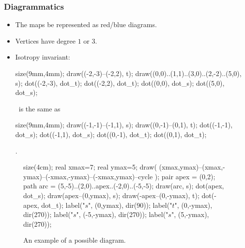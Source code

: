 \documentclass[pdf]{beamer}
\def\ii{\item}
\begin{document}
\begin{frame}[fragile]
	\frametitle{Diagrammatics}
	\begin{itemize}
		\ii The maps be represented as red/blue diagrams.
		\ii Vertices have degree $1$ or $3$.
		\ii Isotropy invariant: 
		\begin{asy}
			size(9mm,4mm);
			draw((-2,-3)--(-2,2), t);
			draw((0,0)..(1,1)..(3,0)..(2,-2)..(5,0), s);
			dot((-2,-3), dot_t);
			dot((-2,2), dot_t);
			dot((0,0), dot_s);
			dot((5,0), dot_s);
		\end{asy}
		\ is the same as
		\begin{asy}
			size(9mm,4mm);
			draw((-1,-1)--(-1,1), s);
			draw((0,-1)--(0,1), t);
			dot((-1,-1), dot_s);
			dot((-1,1), dot_s);
			dot((0,-1), dot_t);
			dot((0,1), dot_t);
		\end{asy}
		.
	\end{itemize}
	\begin{figure}[ht]
		\centering
		\begin{asy}
		size(4cm);
		real xmax=7;
		real ymax=5;
		draw( (xmax,ymax)--(xmax,-ymax)--(-xmax,-ymax)--(-xmax,ymax)--cycle );
		pair apex = (0,2);
		path arc = (5,-5)..(2,0)..apex..(-2,0)..(-5,-5);
		draw(arc, s);
		dot(apex, dot_s);
		draw(apex--(0,ymax), s);
		draw(-apex--(0,-ymax), t);
		dot(-apex, dot_t);
		label("$s$", (0,ymax), dir(90));
		label("$t$", (0,-ymax), dir(270));
		label("$s$", (-5,-ymax), dir(270));
		label("$s$", (5,-ymax), dir(270));
		\end{asy}
		\caption{An example of a possible diagram.}
		\label{fig:example_diagram}
	\end{figure}
\end{frame}
\end{document}

